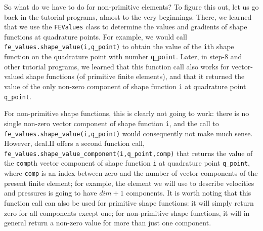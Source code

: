 \documentclass{article}
\begin{document}
So what do we have to do for non-primitive elements? To figure this out, let
us go back in the tutorial programs, almost to the very beginnings. There, we
learned that we use the \texttt{FEValues} class to determine the values and
gradients of shape functions at quadrature points. For example, we would call
\texttt{fe\_values.shape\_value(i,q\_point)} to obtain the value of the
\texttt{i}th shape function on the quadrature point with number
\texttt{q\_point}. Later, in step-8 and other tutorial programs, we learned
that this function call also works for vector-valued shape functions (of
primitive finite elements), and that it returned the value of the only
non-zero component of shape function \texttt{i} at quadrature point
\texttt{q\_point}.

For non-primitive shape functions, this is clearly not going to work: there is
no single non-zero vector component of shape function \texttt{i}, and the call 
to \texttt{fe\_values.shape\_value(i,q\_point)} would consequently not make
much sense. However, deal.II offers a second function call,
\texttt{fe\_values.shape\_value\_component(i,q\_point,comp)} that returns the
value of the \texttt{comp}th vector component of shape function  \texttt{i} at
quadrature point \texttt{q\_point}, where \texttt{comp} is an index between
zero and the number of vector components of the present finite element; for
example, the element we will use to describe velocities and pressures is going
to have $dim+1$ components. It is worth noting that this function call can
also be used for primitive shape functions: it will simply return zero for all
components except one; for non-primitive shape functions, it will in general
return a non-zero value for more than just one component.
\end{document}
